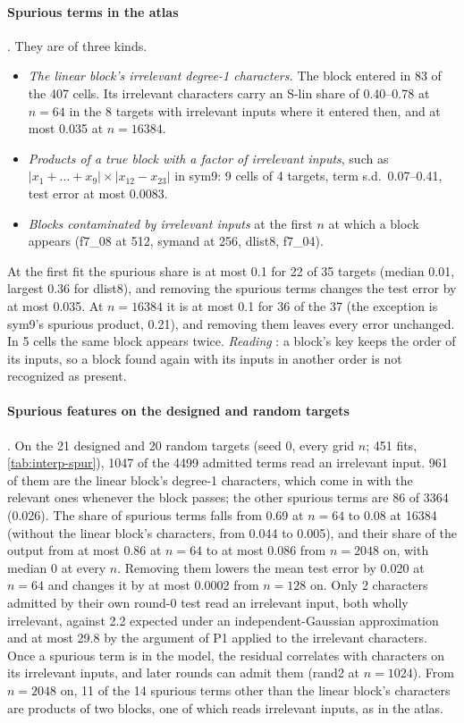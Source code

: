 \paragraph{Spurious terms in the atlas} . They are of three kinds.
\begin{itemize}
\item \emph{The linear block's irrelevant degree-1 characters.} The block entered in 83 of the 407 cells. Its irrelevant characters carry an S-lin share of 0.40--0.78 at $n=64$ in the 8 targets with irrelevant inputs where it entered then, and at most 0.035 at $n=16384$.
\item \emph{Products of a true block with a factor of irrelevant inputs}, such as $|x_1+\dots+x_9|\times|x_{12}-x_{23}|$ in sym9: 9 cells of 4 targets, term s.d.\ 0.07--0.41, test error at most 0.0083.
\item \emph{Blocks contaminated by irrelevant inputs} at the first $n$ at which a block appears (f7\_08 at 512, symand at 256, dlist8, f7\_04).
\end{itemize}
At the first fit the spurious share is at most 0.1 for 22 of 35 targets (median 0.01, largest 0.36 for dlist8), and removing the spurious terms changes the test error by at most 0.035. At $n=16384$ it is at most 0.1 for 36 of the 37 (the exception is sym9's spurious product, 0.21), and removing them leaves every error unchanged. In 5 cells the same block appears twice. \emph{Reading} : a block's key keeps the order of its inputs, so a block found again with its inputs in another order is not recognized as present.

\paragraph{Spurious features on the designed and random targets} . On the 21 designed and 20 random targets (seed 0, every grid $n$; 451 fits, \cref{tab:interp-spur}), 1047 of the 4499 admitted terms read an irrelevant input. 961 of them are the linear block's degree-1 characters, which come in with the relevant ones whenever the block passes; the other spurious terms are 86 of 3364 (0.026). The share of spurious terms falls from 0.69 at $n=64$ to 0.08 at 16384 (without the linear block's characters, from 0.044 to 0.005), and their share of the output from at most 0.86 at $n=64$ to at most 0.086 from $n=2048$ on, with median 0 at every $n$. Removing them lowers the mean test error by 0.020 at $n=64$ and changes it by at most 0.0002 from $n=128$ on. Only 2 characters admitted by their own round-0 test read an irrelevant input, both wholly irrelevant, against 2.2 expected under an independent-Gaussian approximation and at most 29.8 by the argument of P1 applied to the irrelevant characters. Once a spurious term is in the model, the residual correlates with characters on its irrelevant inputs, and later rounds can admit them (rand2 at $n=1024$). From $n=2048$ on, 11 of the 14 spurious terms other than the linear block's characters are products of two blocks, one of which reads irrelevant inputs, as in the atlas.

